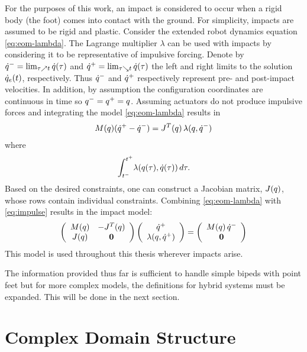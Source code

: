 For the purposes of this work, an impact is considered to occur when a rigid
body (the foot) comes into contact with the ground.
%
For simplicity, impacts are assumed to be rigid and plastic.
%
Consider the extended robot dynamics equation \eqref{eq:eom-lambda}.
%
The Lagrange multiplier $\lambda$ can be used with impacts by considering it to
be representative of impulsive forcing.
%
Denote by $\dot{q}^{-} = \lim_{\tau \nearrow t} \dot{q}(\tau)$ and $\dot{q}^{+} = \lim_{\tau
  \searrow t} \dot{q}(\tau)$ the left and right limits to the solution
$\dot{q}_{e}(t)$, respectively.
%
Thus $\dot{q}^{-}$ and $\dot{q}^{+}$ respectively represent pre- and post-impact velocities.
%
In addition, by assumption the configuration coordinates are continuous in time
so $q^{-} = q^{+} = q$.
%
Assuming actuators do not produce impulsive forces and integrating the model
\eqref{eq:eom-lambda} results in
\begin{align}
  \label{eq:impulse}
  M(q)(\dot{q}^{+} - \dot{q}^{-}) = J^{T}(q) \, \lambda(q, \dot{q}^{-})
\end{align}
where
\begin{align*}
  \int_{t^{-}}^{t^{+}} \! \lambda(q(\tau), \dot{q}(\tau)) \, d\tau.
\end{align*}
%
Based on the desired constraints, one can construct a Jacobian matrix,
$J(q)$, whose rows contain individual constraints.
%
Combining \eqref{eq:eom-lambda} with \eqref{eq:impulse} results in the impact model:
\begin{align*}
  \left(\begin{array}{c c}
      M(q) & -J^{T}(q)\\
      J(q) & {\mathbf 0}
    \end{array}\right)
  \left(\begin{array}{c}
      \dot{q}^{+}\\
      \lambda(q, \dot{q}^{+})
    \end{array}\right) =
  \left(\begin{array}{c}
      M(q) \, \dot{q}^{-}\\
      {\mathbf 0}
    \end{array}\right)
\end{align*}
%
This model is used throughout this thesis wherever impacts arise.

The information provided thus far is sufficient to handle simple bipeds with
point feet but for more complex models, the definitions for hybrid systems must
be expanded.
%
This will be done in the next section.



\section{Complex Domain Structure} \label{sec:complex-models}

